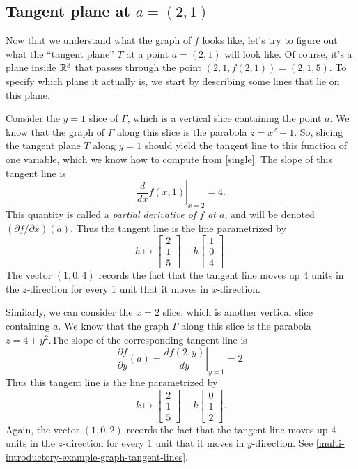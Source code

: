 \subsection*{Tangent plane at \texorpdfstring{$a = (2,1)$}{a = (2,1)}}

Now that we understand what the graph of $f$ looks like, let's try to figure out what the ``tangent plane'' $T$ at a point $a = (2,1)$ will look like. Of course, it's a plane inside $\mathbb{R}^3$ that passes through the point $(2, 1, f(2,1)) = (2, 1, 5)$. To specify which plane it actually is, we start by describing some lines that lie on this plane. 

Consider the $y = 1$ slice of $\Gamma$, which is a vertical slice containing the point $a$. We know that the graph of $\Gamma$ along this slice is the parabola $z = x^2 + 1$. So, slicing the tangent plane $T$ along $y = 1$ should yield the tangent line to this function of one variable, which we know how to compute from \cref{single}. The slope of this tangent line is
\[ \left.\frac{d }{d x} f(x, 1) \right|_{x = 2} = 4. \]
This quantity is called a \emph{partial derivative of $f$ at $a$}, and will be denoted $(\partial f/\partial x)(a)$.  Thus the tangent line is the line parametrized by
\[ h \mapsto \begin{bmatrix} 2 \\ 1 \\ 5 \end{bmatrix} + h \begin{bmatrix} 1 \\ 0 \\ 4 \end{bmatrix}. \]
The vector $(1,0,4)$ records the fact that the tangent line moves up 4 units in the $z$-direction for every 1 unit that it moves in $x$-direction. 

Similarly, we can consider the $x = 2$ slice, which is another vertical slice containing $a$. We know that the graph $\Gamma$ along this slice is the parabola $z = 4 + y^2$.The slope of the corresponding tangent line is
\[ \frac{\partial f}{\partial y}(a) = \left.\frac{d f(2, y)}{dy}\right|_{y = 1} = 2. \]
Thus this tangent line is the line parametrized by
\[ k \mapsto \begin{bmatrix} 2 \\ 1 \\ 5 \end{bmatrix} + k \begin{bmatrix} 0 \\ 1 \\ 2 \end{bmatrix}. \]
Again, the vector $(1,0,2)$ records the fact that the tangent line moves up 4 units in the $z$-direction for every 1 unit that it moves in $y$-direction. See \cref{multi-introductory-example-graph-tangent-lines}.

